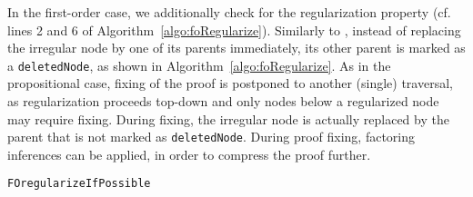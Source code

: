 In the first-order case, we additionally check for the regularization property (cf. lines 2 and 6 of Algorithm~\ref{algo:foRegularize}).
Similarly to {\RPI}, instead of replacing the irregular node by one of its parents immediately, 
its other parent is marked as a \texttt{deletedNode}, as shown in Algorithm~\ref{algo:foRegularize}.
As in the propositional case, fixing of the proof is postponed to another (single) traversal, as regularization proceeds top-down and only nodes below a regularized node may require fixing.
During fixing, the irregular node is actually replaced by the parent that is not marked as \texttt{deletedNode}. During proof fixing, factoring inferences can be applied, in order to compress the proof further.


\begin{algorithm}[bt]
\begin{footnotesize}



\BlankLine
\caption{\label{algo:foRegularize} \texttt{FOregularizeIfPossible}}
\end{footnotesize}
\end{algorithm}


